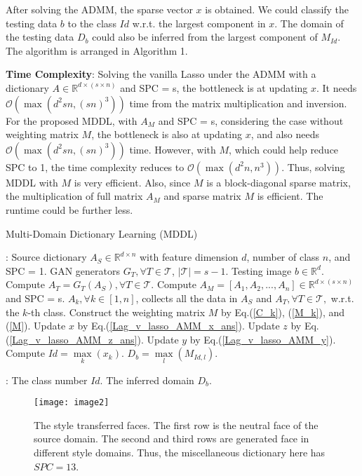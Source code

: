 \documentclass{article}
\begin{document}
After solving the ADMM, the sparse vector $x$ is obtained. We could classify the testing data $b$ to the class $Id$ w.r.t. the largest component in $x$. The domain of the testing data $D_b$ could also be inferred from the largest component of $M_{Id}$. The algorithm is arranged in Algorithm 1. 

{\bf Time Complexity}: Solving the vanilla Lasso under the ADMM with a dictionary $A \in \mathbb{R}^{d \times (s \times n)}$ and SPC = s, the bottleneck is at updating $x$. It needs $\mathcal{O}(\max( d^2 sn, (sn)^{3}))$ time from the matrix multiplication and inversion. For the proposed MDDL, with $A_M$ and SPC = s, considering the case without weighting matrix $M$, the bottleneck is also at updating $x$, and also needs $\mathcal{O}(\max( d^2 sn, (sn)^{3}))$ time. However, with $M$, which could help reduce SPC to 1, the time complexity reduces to $\mathcal{O}(\max( d^2n, n^{3}))$. Thus, solving MDDL with $M$ is very efficient. Also, since $M$ is a block-diagonal sparse matrix, the multiplication of full matrix $A_M$ and sparse matrix $M$ is efficient. The runtime could be further less.

\setlength{\intextsep}{10pt}
\begin{algorithm}[htb]
\caption{Multi-Domain Dictionary Learning (MDDL)}
\begin{algorithmic}[1]
    : Source dictionary $A_S\in \mathbb{R}^{d \times n}$ with feature dimension $d$, number of class $n$, and SPC = 1. GAN generators $G_T, \forall T \in \mathcal{T}$, $|\mathcal{T}|=s-1$. Testing image $b\in \mathbb{R}^{d}$.
    \STATE Compute $A_T=G_T(A_S), \forall T \in \mathcal{T}$.
    \STATE Compute $A_M = [A_1,A_2,...,A_n] \in \mathbb{R}^{d \times (s\times n)}$ and SPC = s. $A_k, \forall k \in [1,n]$, collects all the data in $A_S$ and $A_T, \forall T \in \mathcal{T},$ w.r.t. the $k$-th class. 
    \STATE Construct the weighting matrix $M$ by Eq.(\ref{C_k}), (\ref{M_k}), and (\ref{M}).
        \STATE Update $x$ by Eq.(\ref{Lag_v_lasso_AMM_x_ans}).
        \STATE Update $z$ by Eq.(\ref{Lag_v_lasso_AMM_z_ans}).
        \STATE Update $y$ by Eq.(\ref{Lag_v_lasso_AMM_y}).
    \ENDWHILE
    \STATE Compute $Id = \max \limits_{k}(x_k)$. $D_{b} = \max \limits_{l}(M_{Id,l})$.

    : The class number $Id$. The inferred domain $D_b$.
\end{algorithmic}
\end{algorithm}
\begin{figure}[!htb]
    \centerline{\texttt{[image: image2]}}
    \caption{The style transferred faces. The first row is the neutral face of the source domain. The second and third rows are generated face in different style domains. Thus, the miscellaneous dictionary here has $SPC=13$.}
    \label{ARGAN}
\end{figure}
\end{document}
